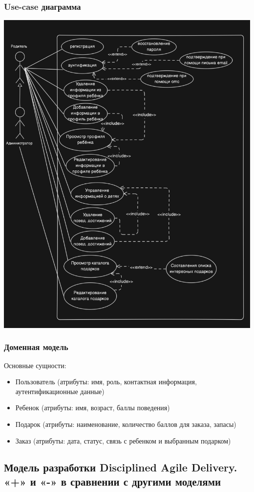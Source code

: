 \documentclass{article}
\begin{document}
\subsubsection{Use-case диаграмма}
\begin{center}
    \includegraphics[width=.7\textwidth]{use-case.png}
\end{center}
\subsubsection{Доменная модель}
Основные сущности:

\begin{itemize}
    \item Пользователь (атрибуты: имя, роль, контактная информация, аутентификационные данные)
    \item Ребенок (атрибуты: имя, возраст, баллы поведения)
    \item Подарок (атрибуты: наименование, количество баллов для заказа, запасы)
    \item Заказ (атрибуты: дата, статус, связь с ребенком и выбранным подарком)
\end{itemize}

\subsection[Disciplined Agile Delivery, +, -]{Модель разработки Disciplined Agile Delivery. «+» и «-» в сравнении с другими моделями}
\end{document}
